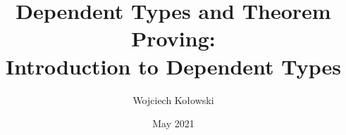 \documentclass{beamer}
\title{Dependent Types and Theorem Proving: \\Introduction to Dependent Types}
\author{Wojciech Kołowski}
\date{May 2021}
\begin{document}
\frame{\titlepage}
\frame{\tableofcontents}
\end{document}
